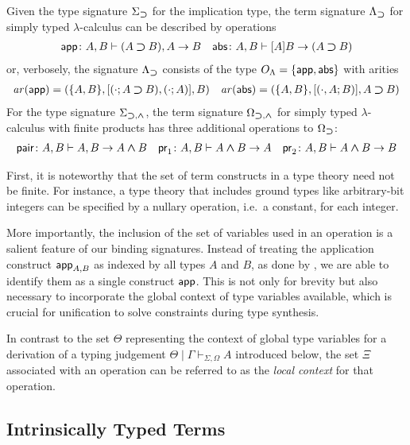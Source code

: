 \documentclass[acmsmall]{acmart}
\theoremstyle{acmdefinition}
\begin{document}
\begin{example} \label{ex:STLC-sig}
  Given the type signature $\Sigma_{\mathbin{\bm{\supset}}}$ for the implication type, the term signature $\Lambda_{\mathbin{\bm{\supset}}}$ for simply typed $\lambda$-calculus can be described by operations
  \begin{align*}
    \mathsf{app}\colon A, B \vdash (A \mathbin{\bm{\supset}} B), A \to B && \mathsf{abs}\colon A , B \vdash [A]B \to (A \mathbin{\bm{\supset}} B)
  \end{align*}
    or, verbosely, the signature $\Lambda_{\mathbin{\bm{\supset}}}$ consists of the type $O_\Lambda = \{\mathsf{app}, \mathsf{abs}\}$ with arities
  \begin{align*}
    \mathit{ar}(\mathsf{app}) = (\{A, B\}, [(\cdot; A \mathbin{\bm{\supset}} B), (\cdot; A)], B)
    && 
    \mathit{ar}(\mathsf{abs}) = (\{A, B\}, [(\cdot, A; B)], A \mathbin{\bm{\supset}} B)
  \end{align*}
  For the type signature $\Sigma_{\mathbin{\bm{\supset}}, \mathbin{\bm{\wedge}}}$, the term signature $\Omega_{\mathbin{\bm{\supset}}, \mathbin{\bm{\wedge}}}$ for simply typed $\lambda$-calculus with finite products has three additional operations
to $\Omega_{\mathbin{\bm{\supset}}}$:
  \begin{align*}
    \mathsf{pair}\colon A, B \vdash A, B \to A \mathbin{\bm{\wedge}} B
    && \mathsf{pr}_{1} \colon A, B \vdash A \mathbin{\bm{\wedge}} B \to A
    && \mathsf{pr}_{2} \colon A, B \vdash A \mathbin{\bm{\wedge}} B \to B
  \end{align*}
\end{example}

First, it is noteworthy that the set of term constructs in a type theory need not be finite.
For instance, a type theory that includes ground types like arbitrary-bit integers can be specified by a nullary operation, i.e.\ a constant, for each integer.

More importantly, the inclusion of the set of variables used in an operation is a salient feature of our binding signatures.
Instead of treating the application construct $\mathsf{app}_{A, B}$ as indexed by all types $A$ and $B$, as done by \citet{Fiore2022}, we are able to identify them as a single construct $\mathsf{app}$.
This is not only for brevity but also necessary to incorporate the global context of type variables available, which is crucial for unification to solve constraints during type synthesis.

In contrast to the set $\Theta$ representing the context of global type variables for a derivation of a typing judgement $\Theta \mid \Gamma \vdash_{\Sigma, \Omega} A$ introduced below, the set $\Xi$ associated with an operation can be referred to as the \emph{local context} for that operation.

\subsection{Intrinsically Typed Terms}
\end{document}
